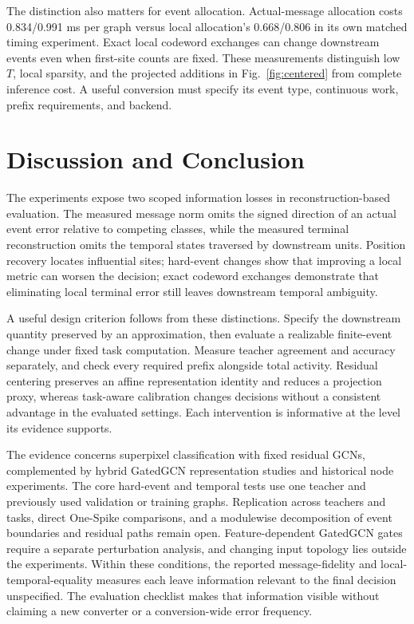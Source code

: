 \documentclass[10pt,twocolumn,letterpaper]{article}
\begin{document}
The distinction also matters for event allocation. Actual-message allocation costs 0.834/0.991 ms per graph versus local allocation's 0.668/0.806 in its own matched timing experiment. Exact local codeword exchanges can change downstream events even when first-site counts are fixed. These measurements distinguish low $T$, local sparsity, and the projected additions in Fig.~\ref{fig:centered} from complete inference cost. A useful conversion must specify its event type, continuous work, prefix requirements, and backend.

\section{Discussion and Conclusion}
The experiments expose two scoped information losses in reconstruction-based evaluation. The measured message norm omits the signed direction of an actual event error relative to competing classes, while the measured terminal reconstruction omits the temporal states traversed by downstream units. Position recovery locates influential sites; hard-event changes show that improving a local metric can worsen the decision; exact codeword exchanges demonstrate that eliminating local terminal error still leaves downstream temporal ambiguity.

A useful design criterion follows from these distinctions. Specify the downstream quantity preserved by an approximation, then evaluate a realizable finite-event change under fixed task computation. Measure teacher agreement and accuracy separately, and check every required prefix alongside total activity. Residual centering preserves an affine representation identity and reduces a projection proxy, whereas task-aware calibration changes decisions without a consistent advantage in the evaluated settings. Each intervention is informative at the level its evidence supports.

The evidence concerns superpixel classification with fixed residual GCNs, complemented by hybrid GatedGCN representation studies and historical node experiments. The core hard-event and temporal tests use one teacher and previously used validation or training graphs. Replication across teachers and tasks, direct One-Spike comparisons, and a modulewise decomposition of event boundaries and residual paths remain open. Feature-dependent GatedGCN gates require a separate perturbation analysis, and changing input topology lies outside the experiments. Within these conditions, the reported message-fidelity and local-temporal-equality measures each leave information relevant to the final decision unspecified. The evaluation checklist makes that information visible without claiming a new converter or a conversion-wide error frequency.
\end{document}
